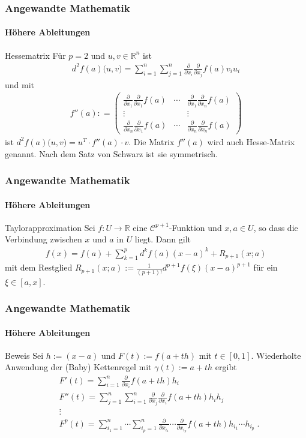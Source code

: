\documentclass{beamer}
\begin{document}
\begin{frame}
    \frametitle{Angewandte Mathematik}
\framesubtitle{Höhere Ableitungen}
    \begin{block}{Hessematrix}
Für $p = 2$ und $u,v \in \mathbb{R}^n$ ist
\begin{align*}
d^2f(a) \bigl(u , v ) = \sum_{i = 1}^n \sum_{j = 1}^n \frac{\partial}{\partial x_{i}}  \frac{\partial}{\partial x_{j}} f(a) v_{i}  u_{i} 
\end{align*}
und mit 
\begin{align*}
f''(a) : = \begin{pmatrix}  \frac{\partial}{\partial x_{1}} \frac{\partial}{\partial x_{1}} f(a)   &  \cdots &  \frac{\partial}{\partial x_{1}} \frac{\partial}{\partial x_{n}} f(a) \\
\vdots & & \vdots  \\
 \frac{\partial}{\partial x_{n}} \frac{\partial}{\partial x_{1}} f(a)   &  \cdots &  \frac{\partial}{\partial x_{n}} \frac{\partial}{\partial x_{n}} f(a)
\end{pmatrix} 
\end{align*}
ist $d^2f(a) \bigl(u , v ) = u^T  \cdot f''(a) \cdot v$. Die Matrix $f''(a)$ wird auch Hesse-Matrix genannt. Nach dem Satz von Schwarz ist sie symmetrisch.
\end{block}
 \end{frame}

\begin{frame}
    \frametitle{Angewandte Mathematik}
\framesubtitle{Höhere Ableitungen}
    \begin{block}{Taylorapproximation}
Sei   $f: U \to \mathbb{R}$ eine $\mathcal{C}^{p+1}$-Funktion und $x,a \in U$, so dass die Verbindung zwischen $x$ und $a$ in $U$ liegt.
Dann gilt
\begin{align*}
f(x) = f(a) + \sum_{k=1}^{p} d^k f(a) (x-a)^k + R_{p+1} (x;a)
\end{align*}
mit dem Restglied $R_{p+1} (x;a) := \frac{1}{(p+1)!} d^{p+1}f(\xi) (x-a)^{p+1}$ für ein $\xi \in [a,x]$.

\end{block}
 \end{frame}


\begin{frame}
    \frametitle{Angewandte Mathematik}
\framesubtitle{Höhere Ableitungen}
    \begin{block}{Beweis}
Sei $h := (x-a)$ und $F(t) := f(a + th)$ mit $t \in [0,1]$. Wiederholte Anwendung der (Baby) Kettenregel mit $\gamma(t) := a +th$ ergibt
\begin{align*}
& F'(t) = \sum_{i=1}^n  \frac{\partial}{\partial x_{i}} f(a + th) h_i \\
& F''(t) =\sum_{j=1}^n \sum_{i=1}^n   \frac{\partial}{\partial x_{j}} \frac{\partial}{\partial x_{i}} f(a + th) h_i h_j \\
& \vdots \\
& F^p(t) =  \sum_{i_1=1}^n  \cdots \sum_{i_p=1}^n   \frac{\partial}{\partial x_{i_1}} \cdots \frac{\partial}{\partial x_{i_p}} f(a + th) h_{i_1} \cdots  h_{i_p}  \; .
\end{align*}
\end{block}
 \end{frame}
\end{document}
